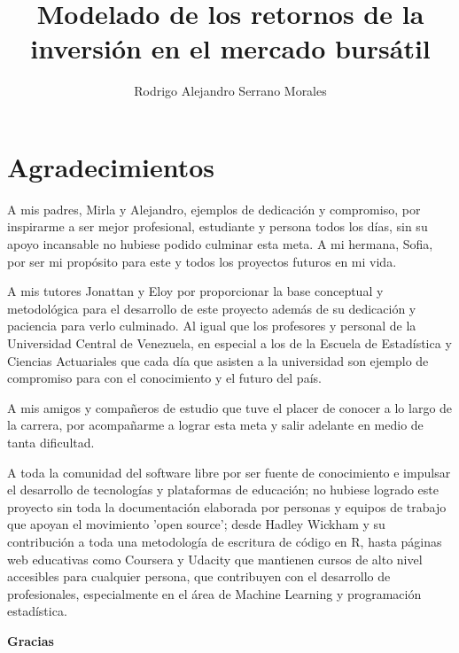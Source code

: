 \documentclass[a4paper,12pt]{Latex/Classes/PhDthesisPSnPDF}
\title{Modelado de los retornos de la inversión en el mercado bursátil}
\author{Rodrigo Alejandro Serrano Morales}
\begin{document}


\maketitle									%

\newpage\renewcommand{\thepage}{\arabic{page}}\setcounter{page}{1} 

\newpage
\chapter*{Agradecimientos}

A mis padres, Mirla y Alejandro, ejemplos de dedicación y compromiso, por inspirarme a ser mejor profesional, estudiante y persona todos los días, sin su apoyo incansable no hubiese podido culminar esta meta. A mi hermana, Sofia, por ser mi propósito para este y todos los proyectos futuros en mi vida.

A mis tutores Jonattan y Eloy por proporcionar la base conceptual y metodológica para el desarrollo de este proyecto además de su dedicación y paciencia para verlo culminado. Al igual que los profesores y personal de la Universidad Central de Venezuela, en especial a los de la Escuela de Estadística y Ciencias Actuariales que cada día que asisten a la universidad son ejemplo de compromiso para con el conocimiento y el futuro del país.

A mis amigos y compañeros de estudio que tuve el placer de conocer a lo largo de la carrera, por acompañarme a lograr esta meta y salir adelante en medio de tanta dificultad.

A toda la comunidad del software libre por ser fuente de conocimiento e impulsar el desarrollo de tecnologías y plataformas de educación; no hubiese logrado este proyecto sin toda la documentación elaborada por personas y equipos de trabajo que apoyan el movimiento 'open source'; desde Hadley Wickham y su contribución a toda una metodología de escritura de código en R, hasta páginas web educativas como Coursera y Udacity que mantienen cursos de alto nivel accesibles para cualquier persona, que contribuyen con el desarrollo de profesionales, especialmente en el área de Machine Learning y programación estadística.

 \begin{flushright}
 \textbf{Gracias}
 \end{flushright}
\end{document}
